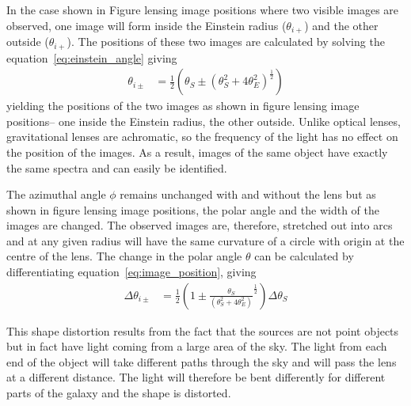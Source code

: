         In the case shown in Figure lensing image positions where two visible images are observed, one image will form inside the Einstein radius ($\theta_{i+}$) and the other outside ($\theta_{i+}$). The positions of these two images are calculated by solving the equation~\ref{eq:einstein_angle} giving
        \begin{align}
            \theta_{i\pm} &= \frac{1}{2}\left( \theta_S \pm {(\theta_S^2 + 4\theta_E^2)} ^{\frac{1}{2}} \right) \label{eq:image_position}
        \end{align}
        yielding the positions of the two images as shown in figure lensing image positions– one inside the Einstein radius, the other outside. Unlike optical lenses, gravitational lenses are achromatic, so the frequency of the light has no effect on the position of the images. As a result, images of the same object have exactly the same spectra and can easily be identified\cite{Hartle}.

        The azimuthal angle $\phi$ remains unchanged with and without the lens but as shown in figure lensing image positions, the polar angle and the width of the images are changed. The observed images are, therefore, stretched out into arcs and at any given radius will have the same curvature of a circle with origin at the centre of the lens\cite{Image_arc_curvature}. The change in the polar angle $\theta$ can be calculated by differentiating equation~\ref{eq:image_position}, giving
        \begin{align}
            \Delta\theta_{i\pm} &= \frac{1}{2}\left( 1 \pm \frac{\theta_S}{(\theta_S^2 +4\theta_E^2)}^{\frac{1}{2}} \right) \Delta\theta_S
        \end{align}

        This shape distortion results from the fact that the sources are not point objects but in fact have light coming from a large area of the sky. The light from each end of the object will take different paths through the sky and will pass the lens at a different distance. The light will therefore be bent differently for different parts of the galaxy and the shape is distorted\cite{Arc_shapes_site}.

